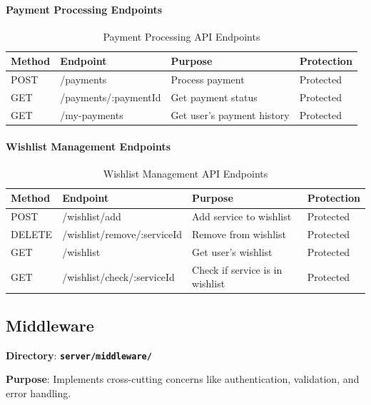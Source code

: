 \documentclass[12pt,a4paper]{article}
\newcommand{\file}[1]{\textbf{\texttt{#1}}}
\begin{document}
\paragraph{Payment Processing Endpoints}
\begin{table}[H]
\centering
\small
\begin{tabular}{@{}llll@{}}
\toprule
\textbf{Method} & \textbf{Endpoint} & \textbf{Purpose} & \textbf{Protection} \\
\midrule
POST & /payments & Process payment & Protected \\
GET & /payments/:paymentId & Get payment status & Protected \\
GET & /my-payments & Get user's payment history & Protected \\
\bottomrule
\end{tabular}
\caption{Payment Processing API Endpoints}
\label{tab:payment-endpoints}
\end{table}

\paragraph{Wishlist Management Endpoints}
\begin{table}[H]
\centering
\small
\begin{tabular}{@{}llll@{}}
\toprule
\textbf{Method} & \textbf{Endpoint} & \textbf{Purpose} & \textbf{Protection} \\
\midrule
POST & /wishlist/add & Add service to wishlist & Protected \\
DELETE & /wishlist/remove/:serviceId & Remove from wishlist & Protected \\
GET & /wishlist & Get user's wishlist & Protected \\
GET & /wishlist/check/:serviceId & Check if service is in wishlist & Protected \\
\bottomrule
\end{tabular}
\caption{Wishlist Management API Endpoints}
\label{tab:wishlist-endpoints}
\end{table}

\subsection{Middleware}
\label{subsec:middleware}

\textbf{Directory}: \file{server/middleware/}

\textbf{Purpose}: Implements cross-cutting concerns like authentication, validation, and error handling.
\end{document}
